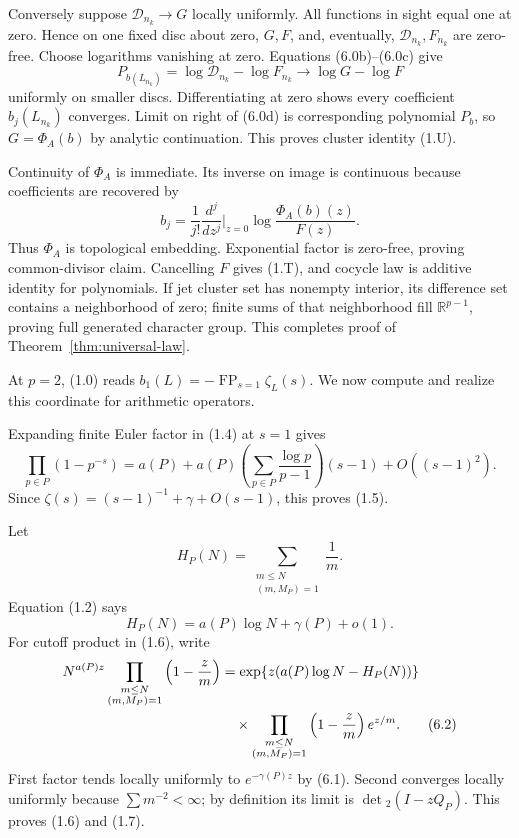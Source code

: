 \documentclass[11pt]{article}
\theoremstyle{definition}
\theoremstyle{remark}
\newcommand{\R}{\mathbb R}
\newcommand{\FP}{\operatorname*{FP}}
\begin{document}
Conversely suppose $\mathcal D_{n_k}\to G$ locally uniformly.  All functions in sight equal one
at zero.  Hence on one fixed disc about zero, $G,F$, and, eventually, $\mathcal D_{n_k},F_{n_k}$
are zero-free.  Choose logarithms vanishing at zero.  Equations (6.0b)--(6.0c) give
\begin{equation}
 P_{b(L_{n_k})}=\log\mathcal D_{n_k}-\log F_{n_k}
 \longrightarrow \log G-\log F                         \tag{6.0d}
\end{equation}
uniformly on smaller discs.  Differentiating at zero shows every coefficient $b_j(L_{n_k})$
converges.  Limit on right of (6.0d) is corresponding polynomial $P_b$, so $G=\Phi_A(b)$ by
analytic continuation.  This proves cluster identity (1.U).

Continuity of $\Phi_A$ is immediate.  Its inverse on image is continuous because coefficients
are recovered by
\[
 b_j=\frac1{j!}\frac{d^j}{dz^j}\bigg|_{z=0}
       \log\frac{\Phi_A(b)(z)}{F(z)}.
\]
Thus $\Phi_A$ is topological embedding.  Exponential factor is zero-free, proving common-divisor
claim.  Cancelling $F$ gives (1.T), and cocycle law is additive identity for polynomials.  If jet
cluster set has nonempty interior, its difference set contains a neighborhood of zero; finite
sums of that neighborhood fill $\R^{p-1}$, proving full generated character group.  This
completes proof of Theorem~\ref{thm:universal-law}.

At $p=2$, (1.0) reads $b_1(L)=-\FP_{s=1}\zeta_L(s)$.  We now compute and realize this coordinate
for arithmetic operators.

Expanding finite Euler factor in (1.4) at $s=1$ gives
\[
 \prod_{p\in P}(1-p^{-s})
 =a(P)+a(P)\left(\sum_{p\in P}\frac{\log p}{p-1}\right)(s-1)
 +O((s-1)^2).
\]
Since $\zeta(s)=(s-1)^{-1}+\gamma+O(s-1)$, this proves (1.5).

Let
\[
 H_P(N)=\sum_{\substack{m\leq N\\(m,M_P)=1}}\frac1m.
\]
Equation (1.2) says
\begin{equation}
 H_P(N)=a(P)\log N+\gamma(P)+o(1).                         \tag{6.1}
\end{equation}
For cutoff product in (1.6), write
\begin{align}
 N^{a(P)z}\prod_{\substack{m\leq N\\(m,M_P)=1}}
 \left(1-\frac zm\right)
 &=\exp\{z(a(P)\log N-H_P(N))\}                            \notag\\
 &\quad\times
 \prod_{\substack{m\leq N\\(m,M_P)=1}}
 \left(1-\frac zm\right)e^{z/m}.                          \tag{6.2}
\end{align}
First factor tends locally uniformly to $e^{-\gamma(P)z}$ by (6.1).  Second converges locally
uniformly because $\sum m^{-2}<\infty$; by definition its limit is
$\det{}_2(I-zQ_P)$.  This proves (1.6) and (1.7).
\end{document}
